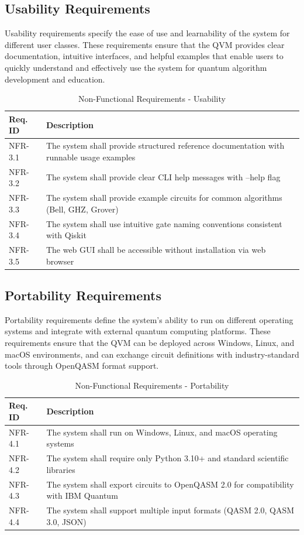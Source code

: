 \subsection{Usability Requirements}

Usability requirements specify the ease of use and learnability of the system for different user classes. These requirements ensure that the QVM provides clear documentation, intuitive interfaces, and helpful examples that enable users to quickly understand and effectively use the system for quantum algorithm development and education.

\begin{table}[H]
\centering
\caption{Non-Functional Requirements - Usability}
\begin{tabular}{|p{2cm}|p{11cm}|}
\hline
\textbf{Req. ID} & \textbf{Description} \\
\hline
NFR-3.1 & The system shall provide structured reference documentation with runnable usage examples \\
\hline
NFR-3.2 & The system shall provide clear CLI help messages with --help flag \\
\hline
NFR-3.3 & The system shall provide example circuits for common algorithms (Bell, GHZ, Grover) \\
\hline
NFR-3.4 & The system shall use intuitive gate naming conventions consistent with Qiskit \\
\hline
NFR-3.5 & The web GUI shall be accessible without installation via web browser \\
\hline
\end{tabular}
\end{table}

\subsection{Portability Requirements}

Portability requirements define the system's ability to run on different operating systems and integrate with external quantum computing platforms. These requirements ensure that the QVM can be deployed across Windows, Linux, and macOS environments, and can exchange circuit definitions with industry-standard tools through OpenQASM format support.

\begin{table}[H]
\centering
\caption{Non-Functional Requirements - Portability}
\begin{tabular}{|p{2cm}|p{11cm}|}
\hline
\textbf{Req. ID} & \textbf{Description} \\
\hline
NFR-4.1 & The system shall run on Windows, Linux, and macOS operating systems \\
\hline
NFR-4.2 & The system shall require only Python 3.10+ and standard scientific libraries \\
\hline
NFR-4.3 & The system shall export circuits to OpenQASM 2.0 for compatibility with IBM Quantum \\
\hline
NFR-4.4 & The system shall support multiple input formats (QASM 2.0, QASM 3.0, JSON) \\
\hline
\end{tabular}
\end{table}

